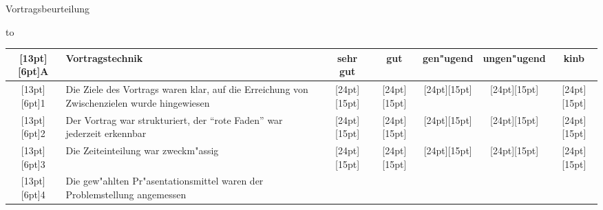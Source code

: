 \documentclass[a4paper,12pt]{article}
\begin{document}
\pagestyle{fancy}

\vspace{1cm}

\begin{center}
{\LARGE Vortragsbeurteilung}
\end{center}

\vspace{0.8cm}

{\parindent0pt\hbox to}


\begin{center}
\begin{tabular}{|c|l|c|c|c|c|c|}
\hline
\raisebox{0pt}[13pt][6pt]{A}&Vortragstechnik&sehr gut&gut&gen"ugend&ungen"ugend&kinb\\
\hline
\raisebox{0pt}[13pt][6pt]{1}&
\begin{minipage}{6.6cm}\raggedright\strut
Die Ziele des Vortrags waren klar, auf die Erreichung
von Zwischenzielen wurde hingewiesen
\strut\end{minipage}&
\raisebox{0pt}[24pt][15pt]{\phantom{XX}}&
\raisebox{0pt}[24pt][15pt]{\phantom{XX}}&
\raisebox{0pt}[24pt][15pt]{\phantom{XX}}&
\raisebox{0pt}[24pt][15pt]{\phantom{XX}}&
\raisebox{0pt}[24pt][15pt]{\phantom{XX}}\\
\hline
\raisebox{0pt}[13pt][6pt]{2}&
\begin{minipage}{6.6cm}\raggedright\strut
Der Vortrag war strukturiert, der ``rote Faden''
war jederzeit erkennbar
\strut\end{minipage}&
\raisebox{0pt}[24pt][15pt]{\phantom{XX}}&
\raisebox{0pt}[24pt][15pt]{\phantom{XX}}&
\raisebox{0pt}[24pt][15pt]{\phantom{XX}}&
\raisebox{0pt}[24pt][15pt]{\phantom{XX}}&
\raisebox{0pt}[24pt][15pt]{\phantom{XX}}\\
\hline
\raisebox{0pt}[13pt][6pt]{3}&
\begin{minipage}{6.6cm}\raggedright\strut
Die Zeiteinteilung war zweckm"assig
\strut\end{minipage}&
\raisebox{0pt}[24pt][15pt]{\phantom{XX}}&
\raisebox{0pt}[24pt][15pt]{\phantom{XX}}&
\raisebox{0pt}[24pt][15pt]{\phantom{XX}}&
\raisebox{0pt}[24pt][15pt]{\phantom{XX}}&
\raisebox{0pt}[24pt][15pt]{\phantom{XX}}\\
\hline
\raisebox{0pt}[13pt][6pt]{4}&
\begin{minipage}{6.6cm}\raggedright\strut
Die gew"ahlten Pr"asentations\-mittel waren der Problemstellung
angemessen
\strut\end{minipage}&

\end{tabular}
\end{center}
\end{document}
